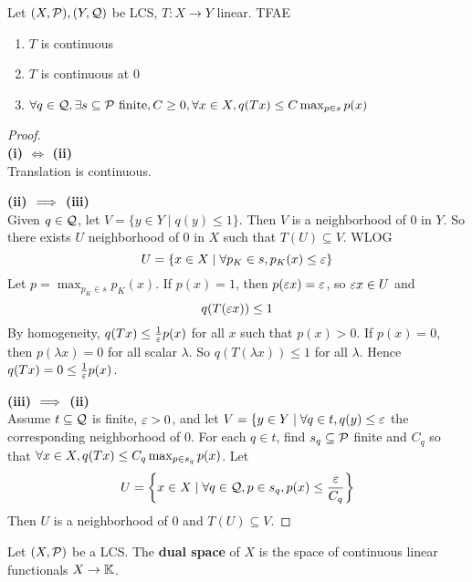 \documentclass{article}
\begin{document}
\begin{lem}\label{lem:lcs-continuity}
  Let $(X, \mathcal P), (Y, \mathcal Q)$ be LCS, $T : X \to Y$ linear. TFAE
  \begin{enumerate}
    \item $T$ is continuous
    \item $T$ is continuous at $0$
    \item $\forall q \in \mathcal Q, \exists s \subseteq \mathcal P \text{ finite}, C \ge 0, \forall x \in X, q(Tx) \le C\max_{p \in s} p(x)$
  \end{enumerate}
\end{lem}
\begin{proof}~\\
  {\bf (i) $\iff$ (ii)} \\
  Translation is continuous.

  {\bf (ii) $\implies$ (iii)} \\
  Given $q \in \mathcal Q$, let $V = \{y \in Y \mid q(y) \le 1\}$. Then $V$ is a neighborhood of $0$ in $Y$. So there exists $U$ neighborhood of $0$ in $X$ such that $T(U) \subseteq V$. WLOG
  $$U = \{x \in X \mid \forall p_K \in s, p_K(x) \le \varepsilon\}$$
  Let $p = \max_{p_K \in s} p_K(x)$. If $p(x) = 1$, then $p(\varepsilon x) = \varepsilon$, so $\varepsilon x \in U$ and
  $$q(T(\varepsilon x)) \le 1$$
  By homogeneity, $q(Tx) \le \frac 1{\varepsilon} p(x)$ for all $x$ such that $p(x) > 0$. If $p(x) = 0$, then $p(\lambda x) = 0$ for all scalar $\lambda$. So $q(T(\lambda x)) \le 1$ for all $\lambda$. Hence $q(Tx) = 0 \le \frac 1{\varepsilon} p(x)$.

  {\bf (iii) $\implies$ (ii)} \\
  Assume $t \subseteq \mathcal Q$ is finite, $\varepsilon > 0$, and let $V = \{y \in Y \mid \forall q \in t, q(y) \le \varepsilon$ the corresponding neighborhood of $0$. For each $q \in t$, find $s_q \subseteq \mathcal P$ finite and $C_q$ so that $\forall x \in X, q(Tx) \le C_q\max_{p \in s_q}p(x)$. Let
  $$U = \left\{x \in X \mid \forall q \in \mathcal Q, p \in s_q, p(x) \le \frac{\varepsilon}{C_q}\right\}$$
  Then $U$ is a neighborhood of $0$ and $T(U) \subseteq V$.
\end{proof}

\begin{dfn*}
  Let $(X, \mathcal P)$ be a LCS. The {\bf dual space} of $X$ is the space of continuous linear functionals $X \to \mathbb K$.
\end{dfn*}

\newlec
\end{document}
